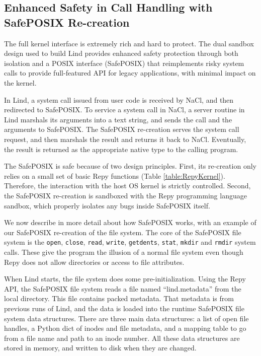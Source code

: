 \subsection{Enhanced Safety in Call Handling with SafePOSIX Re-creation}

The full kernel interface is extremely rich and hard to protect.
The dual sandbox \lip design used to build Lind provides enhanced
safety protection through both isolation and a POSIX interface (SafePOSIX) that
reimplements risky system calls to
provide full-featured API for legacy applications, with minimal impact on the kernel.

In Lind, a system call issued from user code is
received by NaCl, and then redirected to SafePOSIX. 
To service a system call in NaCl, a server routine in 
Lind marshals its arguments into a text string, and sends the call and the arguments 
to SafePOSIX. The SafePOSIX re-creation serves the system call request, and then marshals the result and
returns it back to NaCl. Eventually, the result is returned as the appropriate
native type to the calling program.

The SafePOSIX is safe because of two design principles. 
First, its re-creation only relies on a small set of basic Repy functions (Table \ref{table:RepyKernel}). 
Therefore, the interaction with the host OS kernel is strictly controlled. 
Second, the SafePOSIX re-creation is sandboxed with the Repy programming language sandbox, 
which properly isolates any bugs inside SafePOSIX itself. 

We now describe in more detail about how SafePOSIX works, 
with an example of our SafePOSIX re-creation of the file system. 
The core of the SafePOSIX file system is the \texttt{open}, \texttt{close}, \texttt{read}, \texttt{write}, 
\texttt{getdents}, \texttt{stat}, \texttt{mkdir} and \texttt{rmdir} system calls. 
These give the program the illusion of a normal file system even though Repy does not allow directories or access to file attributes. 

When Lind starts, the file system does some pre-initialization. Using the Repy API, the SafePOSIX file system reads a file named ``lind.metadata'' 
from the local directory. This file contains packed metadata. That metadata is from previous runs of Lind, 
and the data is loaded into the runtime SafePOSIX file system data structures. 
There are three main data structures: a list of open file handles, a Python dict of inodes and file metadata, 
and a mapping table to go from a file name and path to an inode number. 
All these data structures are stored in memory, and written to disk when they are changed. 

